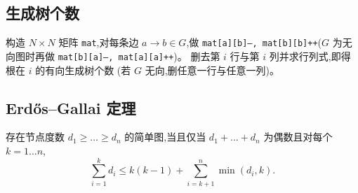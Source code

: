 	\subsection{生成树个数}
		构造 $N\times N$ 矩阵 \texttt{mat},对每条边 $a \rightarrow b \in G$,做
		\texttt{mat[a][b]--, mat[b][b]++}($G$ 为无向图时再做 \texttt{mat[b][a]--, mat[a][a]++})。
		删去第 $i$ 行与第 $i$ 列并求行列式,即得根在 $i$ 的有向生成树个数
		(若 $G$ 无向,删任意一行与任意一列)。

	\subsection{Erdős–Gallai 定理}
		存在节点度数 $d_1 \ge \dots \ge d_n$ 的简单图,当且仅当 $d_1 + \dots + d_n$ 为偶数且对每个 $k = 1\dots n$,
		\[ \sum _{i=1}^{k}d_{i}\leq k(k-1)+\sum _{i=k+1}^{n}\min(d_{i},k). \]

